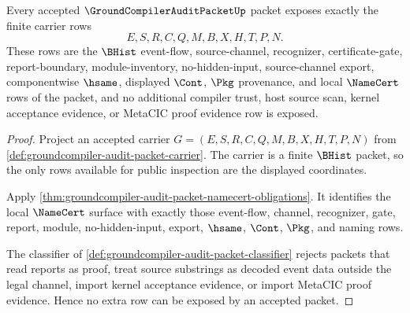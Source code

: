 \begin{theorem}
\label{thm:groundcompiler-audit-packet-carrier-exposure}
Every accepted $\GroundCompilerAuditPacketUp$ packet exposes exactly the finite carrier rows
$$
E,S,R,C,Q,M,B,X,H,T,P,N.
$$
These rows are the $\BHist$ event-flow, source-channel, recognizer, certificate-gate, report-boundary, module-inventory, no-hidden-input, source-channel export, componentwise $\hsame$, displayed $\Cont$, $\Pkg$ provenance, and local $\NameCert$ rows of the packet, and no additional compiler trust, host source scan, kernel acceptance evidence, or MetaCIC proof evidence row is exposed.
\end{theorem}
\begin{proof}
Project an accepted carrier $G=(E,S,R,C,Q,M,B,X,H,T,P,N)$ from \autoref{def:groundcompiler-audit-packet-carrier}. The carrier is a finite $\BHist$ packet, so the only rows available for public inspection are the displayed coordinates.

Apply \autoref{thm:groundcompiler-audit-packet-namecert-obligations}. It identifies the local $\NameCert$ surface with exactly those event-flow, channel, recognizer, gate, report, module, no-hidden-input, export, $\hsame$, $\Cont$, $\Pkg$, and naming rows.

The classifier of \autoref{def:groundcompiler-audit-packet-classifier} rejects packets that read reports as proof, treat source substrings as decoded event data outside the legal channel, import kernel acceptance evidence, or import MetaCIC proof evidence. Hence no extra row can be exposed by an accepted packet.
\end{proof}

